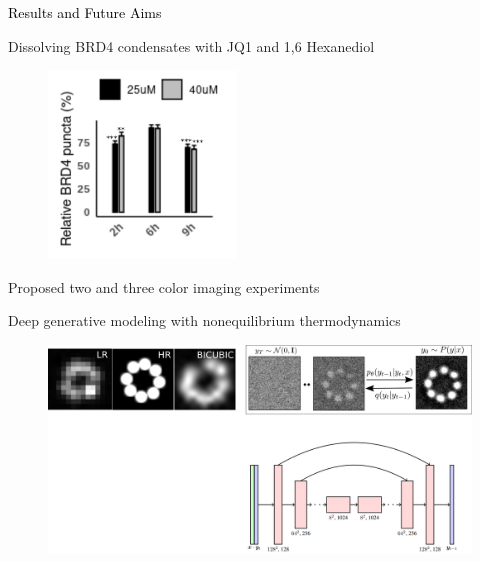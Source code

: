 \documentclass{beamer}					%
\begin{document}
\begin{frame}
\frametitle{}
\centering
\Large \textcolor{black}{Results and Future Aims}
\end{frame}


\begin{frame}{Dissolving BRD4 condensates with JQ1 and 1,6 Hexanediol}
\begin{figure}
\includegraphics[width=5cm]{BRD4-JQ1.png}
\end{figure}
\end{frame}

\begin{frame}{}
Proposed two and three color imaging experiments
\end{frame}

\begin{frame}{Deep generative modeling with nonequilibrium thermodynamics}
\begin{figure}
\includegraphics[width=12cm]{Diffusion.png}
\end{figure}
\end{frame}
\end{document}
